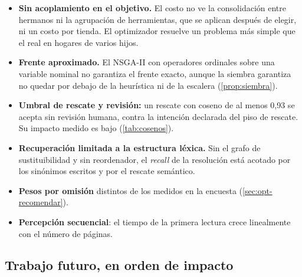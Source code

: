 \begin{itemize}
  \item \textbf{Sin acoplamiento en el objetivo.} El costo no ve la
        consolidación entre hermanos ni la agrupación de herramientas, que se
        aplican después de elegir, ni un costo por tienda. El optimizador
        resuelve un problema más simple que el real en hogares de varios hijos.
  \item \textbf{Frente aproximado.} El NSGA-II con operadores ordinales sobre
        una variable nominal no garantiza el frente exacto, aunque la siembra
        garantiza no quedar por debajo de la heurística ni de la escalera
        (\cref{prop:siembra}).
  \item \textbf{Umbral de rescate y revisión:} un rescate con coseno de al
        menos 0,93 se acepta sin revisión humana, contra la intención declarada
        del piso de rescate. Su impacto medido es bajo (\cref{tab:cosenos}).
  \item \textbf{Recuperación limitada a la estructura léxica.} Sin el grafo de
        sustituibilidad y sin reordenador, el \emph{recall} de la resolución
        está acotado por los sinónimos escritos y por el rescate semántico.
  \item \textbf{Pesos por omisión} distintos de los medidos en la encuesta
        (\cref{sec:opt-recomendar}).
  \item \textbf{Percepción secuencial}: el tiempo de la primera lectura crece
        linealmente con el número de páginas.
\end{itemize}

\subsection{Trabajo futuro, en orden de impacto}

